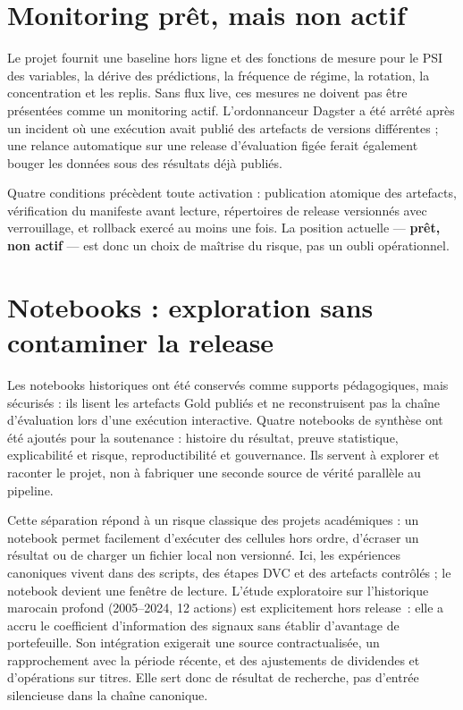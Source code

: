\section{Monitoring prêt, mais non actif}

Le projet fournit une baseline hors ligne et des fonctions de mesure pour le
PSI des variables, la dérive des prédictions, la fréquence de régime, la
rotation, la concentration et les replis. Sans flux live, ces mesures ne doivent
pas être présentées comme un monitoring actif. L'ordonnanceur Dagster a été
arrêté après un incident où une exécution avait publié des artefacts de versions
différentes ; une relance automatique sur une release d'évaluation figée ferait
également bouger les données sous des résultats déjà publiés.

Quatre conditions précèdent toute activation : publication atomique des
artefacts, vérification du manifeste avant lecture, répertoires de release
versionnés avec verrouillage, et rollback exercé au moins une fois. La position
actuelle — \textbf{prêt, non actif} — est donc un choix de maîtrise du risque,
pas un oubli opérationnel.

\section{Notebooks : exploration sans contaminer la release}

Les notebooks historiques ont été conservés comme supports pédagogiques, mais
sécurisés : ils lisent les artefacts Gold publiés et ne reconstruisent pas la
chaîne d'évaluation lors d'une exécution interactive. Quatre notebooks de
synthèse ont été ajoutés pour la soutenance : histoire du résultat, preuve
statistique, explicabilité et risque, reproductibilité et gouvernance. Ils
servent à explorer et raconter le projet, non à fabriquer une seconde source de
vérité parallèle au pipeline.

Cette séparation répond à un risque classique des projets académiques : un
notebook permet facilement d'exécuter des cellules hors ordre, d'écraser un
résultat ou de charger un fichier local non versionné. Ici, les expériences
canoniques vivent dans des scripts, des étapes DVC et des artefacts contrôlés ;
le notebook devient une fenêtre de lecture. L'étude exploratoire sur l'historique
marocain profond (2005--2024, 12 actions) est explicitement hors release~: elle
a accru le coefficient d'information des signaux sans établir d'avantage de
portefeuille. Son intégration exigerait une source contractualisée, un
rapprochement avec la période récente, et des ajustements de dividendes et
d'opérations sur titres. Elle sert donc de résultat de recherche, pas d'entrée
silencieuse dans la chaîne canonique.

